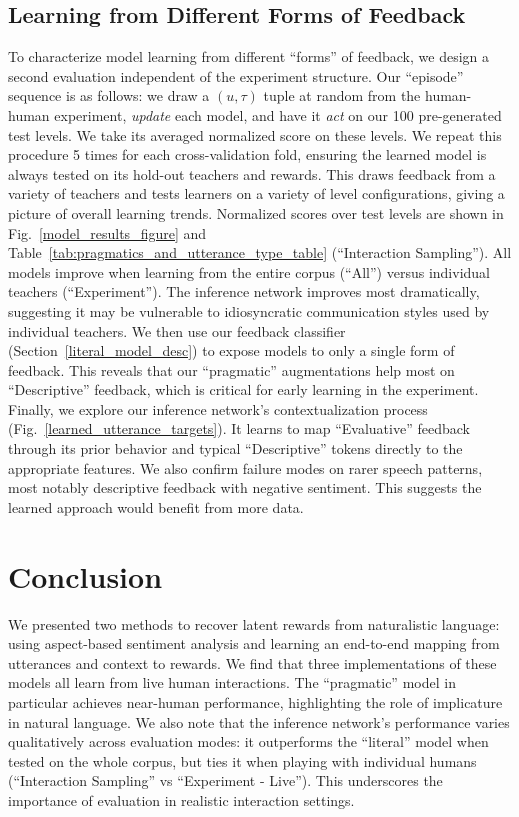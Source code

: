 \documentclass[letterpaper]{article} %
\begin{document}
\subsection{Learning from Different Forms of Feedback}
\label{random_sample_interactions}
\label{feedback_types}
To characterize model learning from different ``forms'' of feedback, we design a second evaluation independent of the experiment structure. Our ``episode'' sequence is as follows: we draw a $(u, \tau)$ tuple at random from the human-human experiment, \emph{update} each model, and have it \emph{act} on our 100 pre-generated test levels. We take its averaged normalized score on these levels. We repeat this procedure 5 times for each cross-validation fold, ensuring the learned model is always tested on its hold-out teachers and rewards. This draws feedback from a variety of teachers and tests learners on a variety of level configurations, giving a picture of overall learning trends. Normalized scores over test levels are shown in Fig.~\ref{model_results_figure} and Table~\ref{tab:pragmatics_and_utterance_type_table} (``Interaction Sampling''). All models improve when learning from the entire corpus (``All'') versus individual teachers (``Experiment''). The inference network improves most dramatically, suggesting it may be vulnerable to idiosyncratic communication styles used by individual teachers. We then use our feedback classifier (Section~\ref{literal_model_desc}) to expose models to only a single form of feedback. This reveals that our ``pragmatic'' augmentations help most on ``Descriptive'' feedback, which is critical for early learning in the experiment. Finally, we explore our inference network's contextualization process (Fig.~\ref{learned_utterance_targets}). It learns to map ``Evaluative'' feedback through its prior behavior and typical ``Descriptive'' tokens directly to the appropriate features. We also confirm failure modes on rarer speech patterns, most notably descriptive feedback with negative sentiment. This suggests the learned approach would benefit from more data.

\vspace{-0.77mm}
\section{Conclusion}
\label{conclusion_section}
We presented two methods to recover latent rewards from naturalistic language: using aspect-based sentiment analysis and learning an end-to-end mapping from utterances and context to rewards. We find that three implementations of these models all learn from live human interactions. The ``pragmatic'' model in particular achieves near-human performance, highlighting the role of implicature in natural language. We also note that the inference network's performance varies qualitatively across evaluation modes: it outperforms the ``literal'' model when tested on the whole corpus, but ties it when playing with individual humans (``Interaction Sampling'' vs ``Experiment - Live''). This underscores the importance of evaluation in realistic interaction settings.
\end{document}
